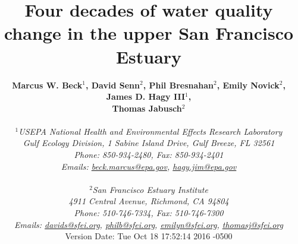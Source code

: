 \documentclass[letterpaper,12pt,oneside]{article}\usepackage[]{graphicx}\usepackage[]{color}
\begin{document}
\raggedbottom
\linenumbers
\raggedright
{}
\setlength{\parindent}{0.5in}
\renewcommand\refname{References \vspace{12pt}}

\begin{singlespace}
\title{{\bf {\Large Four decades of water quality change in the upper San Francisco Estuary}}}
\author{
  {\bf {\normalsize Marcus W. Beck$^1$, David Senn$^2$, Phil Bresnahan$^2$, Emily Novick$^2$, James D. Hagy III$^1$,}}
  \\{\bf {\normalsize Thomas Jabusch$^2$}}
  \\\\{\textit {\normalsize $^1$USEPA National Health and Environmental Effects Research Laboratory}}
  \\{\textit {\normalsize Gulf Ecology Division, 1 Sabine Island Drive, Gulf Breeze, FL 32561}}
	\\{\textit {\normalsize Phone: 850-934-2480, Fax: 850-934-2401}}
	\\{\textit {\normalsize Emails: \href{mailto:beck.marcus@epa.gov}{beck.marcus@epa.gov}, \href{mailto:hagy.jim@epa.gov}{hagy.jim@epa.gov}}}
  \\\\{\textit {\normalsize $^2$San Francisco Estuary Institute}}
	\\{\textit {\normalsize 4911 Central Avenue, Richmond, CA 94804}}
	\\{\textit {\normalsize Phone: 510-746-7334, Fax: 510-746-7300}}
	\\{\textit {\normalsize Emails: \href{mailto:davids@sfei.org}{davids@sfei.org}, \href{mailto:philb@sfei.org}{philb@sfei.org}, \href{mailto:emilyn@sfei.org}{emilyn@sfei.org}, \href{mailto:thomasj@sfei.org}{thomasj@sfei.org}}}
  \vspace{1in} 
  \\ Version Date:   Tue Oct 18 17:52:14 2016 -0500
	}
\date{}
\maketitle
\end{singlespace}
\clearpage
\end{document}
